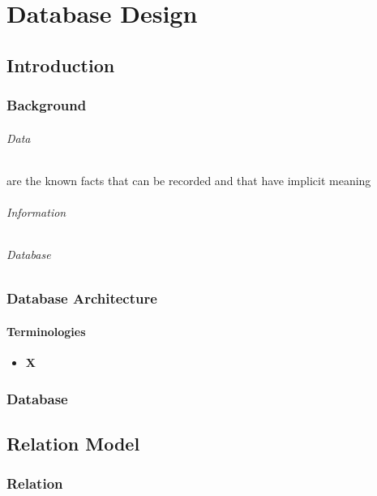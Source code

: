 \part{Database Design}

\chapter{Introduction}
\section{Background}
\paragraph{Data} are the known facts that can be recorded and that have implicit meaning
\paragraph{Information}
\paragraph{Database}

\section{Database Architecture}
\subsection{Terminologies}
\begin{itemize}
	\item \textbf{X}
\end{itemize}
\section{Database}

\chapter{Relation Model}
\section{Relation}

